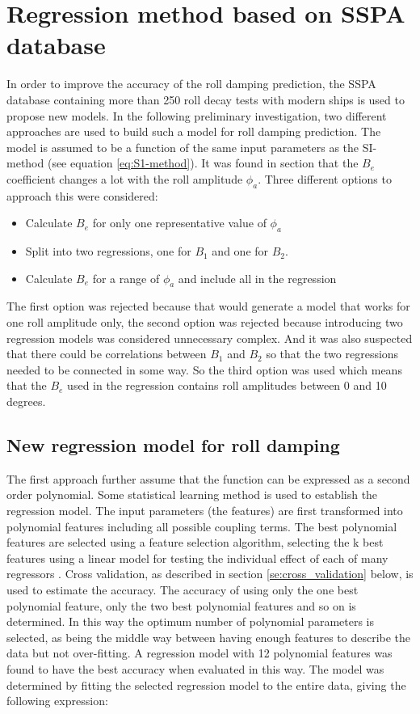 \section{Regression method based on SSPA database}
\label{se:correction_SI_method}
In order to improve the accuracy of the roll damping prediction, the SSPA database containing more than 250 roll decay tests with modern ships is used to propose new models. In the following preliminary investigation, two different approaches are used to build such a model for roll damping prediction. The model is assumed to be a function of the same input parameters as the SI-method (see equation \ref{eq:S1-method}). It was found in section \label{se:overall_comparison} that the $B_e$ coefficient changes a lot with the roll amplitude $\phi_a$. Three different options to approach this were considered:
\begin{itemize}
    \item Calculate $B_e$ for only one representative value of $\phi_a$
    \item Split into two regressions, one for $B_1$ and one for $B_2$.
    \item Calculate $B_e$ for a range of $\phi_a$ and include all in the regression
\end{itemize}
The first option was rejected because that would generate a model that works for one roll amplitude only, the second option was rejected because introducing two regression models was considered unnecessary complex. And it was also suspected that there could be correlations between $B_1$ and $B_2$ so that the two regressions needed to be connected in some way. So the third option was used which means that the $B_e$ used in the regression contains roll amplitudes between 0 and 10 degrees.  

\subsection{New regression model for roll damping}
The first approach further assume that the function can be expressed as a second order polynomial. Some statistical learning method is used to establish the regression model. The input parameters (the features) are first transformed into polynomial features including all possible coupling terms. The best polynomial features are selected using a feature selection algorithm, selecting the k best features \parencite[]{noauthor_sklearnfeature_selectionselectkbest_nodate} using a linear model for testing the individual effect of each of many regressors \parencite[]{noauthor_sklearnfeature_selectionf_regression_nodate}. Cross validation, as described in section \ref{se:cross_validation} below, is used to estimate the accuracy. The accuracy of using only the one best polynomial feature, only the two best polynomial features and so on is determined. In this way the optimum number of polynomial parameters is selected, as being the middle way between having enough features to describe the data but not over-fitting. A regression model with 12 polynomial features was found to have the best accuracy when evaluated in this way. The model was determined by fitting the selected regression model to the entire data, giving the following expression:

